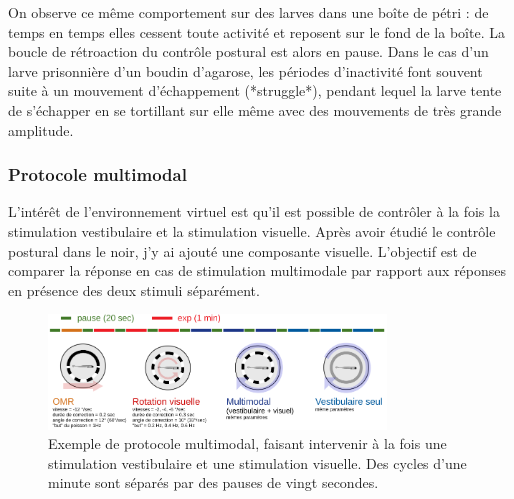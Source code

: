 On observe ce même comportement sur des larves dans une boîte de pétri : de temps en temps elles cessent toute activité et reposent sur le fond de la boîte. La boucle de rétroaction du contrôle postural est alors en pause. Dans le cas d'un larve prisonnière d'un boudin d'agarose, les périodes d'inactivité font souvent suite à un mouvement d'échappement (*struggle*), pendant lequel la larve tente de s'échapper en se tortillant sur elle même avec des mouvements de très grande amplitude.

\subsubsection{Protocole multimodal}
L'intérêt de l'environnement virtuel est qu'il est possible de contrôler à la fois la stimulation vestibulaire et la stimulation visuelle. Après avoir étudié le contrôle postural dans le noir, j'y ai ajouté une composante visuelle. L'objectif est de comparer la réponse en cas de stimulation multimodale par rapport aux réponses en présence des deux stimuli séparément.

\begin{figure}
\centering
\includegraphics[width=0.8\textwidth]{./files/protocole_multimodal.svg.png}
\caption{
Exemple de protocole multimodal, faisant intervenir à la fois une stimulation vestibulaire et une stimulation visuelle. Des cycles d'une minute sont séparés par des pauses de vingt secondes.
}
\end{figure}

